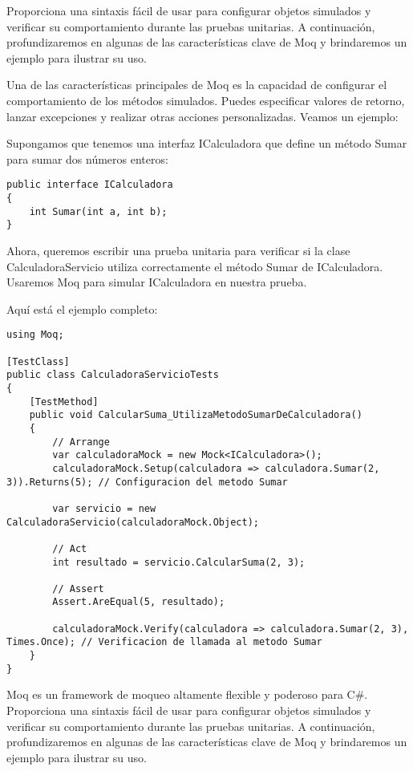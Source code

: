 \documentclass[executivepaper]{article}
\begin{document}
Proporciona una sintaxis fácil de usar para configurar objetos simulados y verificar su comportamiento durante las pruebas unitarias. A continuación, profundizaremos en algunas de las características clave de Moq y brindaremos un ejemplo para ilustrar su uso.

Una de las características principales de Moq es la capacidad de configurar el comportamiento de los métodos simulados. Puedes especificar valores de retorno, lanzar excepciones y realizar otras acciones personalizadas. Veamos un ejemplo:

Supongamos que tenemos una interfaz ICalculadora que define un método Sumar para sumar dos números enteros:

\begin{lstlisting}
public interface ICalculadora
{
    int Sumar(int a, int b);
}
\end{lstlisting}

Ahora, queremos escribir una prueba unitaria para verificar si la clase CalculadoraServicio utiliza correctamente el método Sumar de ICalculadora. Usaremos Moq para simular ICalculadora en nuestra prueba.

Aquí está el ejemplo completo:

\begin{lstlisting}
using Moq;
    
[TestClass]
public class CalculadoraServicioTests
{
    [TestMethod]
    public void CalcularSuma_UtilizaMetodoSumarDeCalculadora()
    {
        // Arrange
        var calculadoraMock = new Mock<ICalculadora>();
        calculadoraMock.Setup(calculadora => calculadora.Sumar(2, 3)).Returns(5); // Configuracion del metodo Sumar

        var servicio = new CalculadoraServicio(calculadoraMock.Object);

        // Act
        int resultado = servicio.CalcularSuma(2, 3);

        // Assert
        Assert.AreEqual(5, resultado);

        calculadoraMock.Verify(calculadora => calculadora.Sumar(2, 3), Times.Once); // Verificacion de llamada al metodo Sumar
    }
}
\end{lstlisting}

Moq es un framework de moqueo altamente flexible y poderoso para C\#. Proporciona una sintaxis fácil de usar para configurar objetos simulados y verificar su comportamiento durante las pruebas unitarias. A continuación, profundizaremos en algunas de las características clave de Moq y brindaremos un ejemplo para ilustrar su uso.
\end{document}
